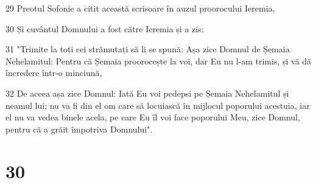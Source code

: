 \par 29 Preotul Sofonie a citit această scrisoare în auzul proorocului Ieremia,
\par 30 Și cuvântul Domnului a fost către Ieremia și a zis:
\par 31 "Trimite la toți cei strămutați să li se spună: Așa zice Domnul de Șemaia Nehelamitul: Pentru că Șemaia proorocește la voi, dar Eu nu l-am trimis, și vă dă încredere într-o minciună,
\par 32 De aceea așa zice Domnul: Iată Eu voi pedepsi pe Șemaia Nehelamitul și neamul lui; nu va fi din el om care să locuiască în mijlocul poporului acestuia, iar el nu va vedea binele acela, pe care Eu îl voi face poporului Meu, zice Domnul, pentru că a grăit împotriva Domnului".

\chapter{30}

